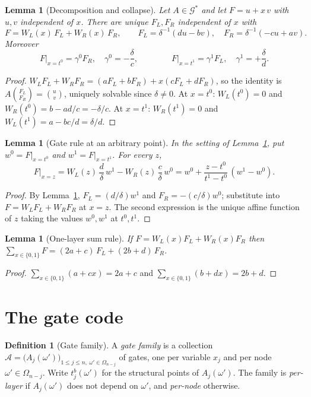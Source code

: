 \documentclass[11pt]{article}
\newtheorem{lemma}[theorem]{Lemma}
\theoremstyle{definition}
\newtheorem{definition}[theorem]{Definition}
\newcommand{\Gs}{\mathcal{G}^{*}}
\begin{document}
\begin{lemma}[Decomposition and collapse]\label{lem:collapse}
Let $A\in\Gs$ and let $F=u+x\,v$ with $u,v$ independent of $x$. There are unique $F_L,F_R$
independent of $x$ with
\[
F=W_L(x)\,F_L+W_R(x)\,F_R,\qquad F_L=\delta^{-1}(du-bv),\quad F_R=\delta^{-1}(-cu+av).
\]
Moreover
\[
F\big|_{x=t^0}=\gamma^0F_R,\quad \gamma^0=-\frac{\delta}{c},\qquad\qquad
F\big|_{x=t^1}=\gamma^1F_L,\quad \gamma^1=+\frac{\delta}{d}.
\]
\end{lemma}
\begin{proof}
$W_LF_L+W_RF_R=(aF_L+bF_R)+x(cF_L+dF_R)$, so the identity is $A\binom{F_L}{F_R}=\binom{u}{v}$,
uniquely solvable since $\delta\neq0$. At $x=t^0$: $W_L(t^0)=0$ and
$W_R(t^0)=b-ad/c=-\delta/c$. At $x=t^1$: $W_R(t^1)=0$ and $W_L(t^1)=a-bc/d=\delta/d$.
\end{proof}

\begin{lemma}[Gate rule at an arbitrary point]\label{lem:gate-rule}
In the setting of Lemma~\ref{lem:collapse}, put $w^0=F|_{x=t^0}$ and $w^1=F|_{x=t^1}$. For every $z$,
\[
F\big|_{x=z}=W_L(z)\,\frac{d}{\delta}\,w^1-W_R(z)\,\frac{c}{\delta}\,w^0
= w^0+\frac{z-t^0}{t^1-t^0}\,(w^1-w^0).
\]
\end{lemma}
\begin{proof}
By Lemma~\ref{lem:collapse}, $F_L=(d/\delta)w^1$ and $F_R=-(c/\delta)w^0$; substitute into
$F=W_LF_L+W_RF_R$ at $x=z$. The second expression is the unique affine function of $z$ taking the
values $w^0,w^1$ at $t^0,t^1$.
\end{proof}

\begin{lemma}[One-layer sum rule]\label{lem:sumrule}
If $F=W_L(x)F_L+W_R(x)F_R$ then
$\sum_{x\in\{0,1\}}F=(2a+c)\,F_L+(2b+d)\,F_R$.
\end{lemma}
\begin{proof}
$\sum_{x\in\{0,1\}}(a+cx)=2a+c$ and $\sum_{x\in\{0,1\}}(b+dx)=2b+d$.
\end{proof}

\section{The gate code}\label{sec:code}

\begin{definition}[Gate family]
A \emph{gate family} is a collection
$\mathcal{A}=\bigl(A_j(\omega')\bigr)_{1\le j\le n,\ \omega'\in\Omega_{n-j}}$ of gates, one per
variable $x_j$ and per node $\omega'\in\Omega_{n-j}$. Write $t_j^b(\omega')$ for the structural
points of $A_j(\omega')$. The family is \emph{per-layer} if $A_j(\omega')$ does not depend on
$\omega'$, and \emph{per-node} otherwise.
\end{definition}
\end{document}
